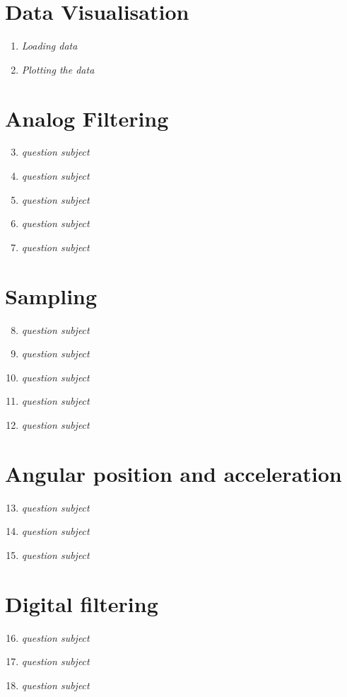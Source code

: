 \documentclass[a4paper,12pt]{article}
\begin{document}
\section{Data Visualisation}
\begin{enumerate}[label={\color{blue}\arabic*)}]

\item \emph{Loading data}


\item \emph{Plotting the data}
\end{enumerate}

\section{Analog Filtering}
\begin{enumerate}[label={\color{blue}\arabic*)}]
  \setcounter{enumi}{2}
  \item \emph{question subject}
  \item \emph{question subject}
  \item \emph{question subject}
  \item \emph{question subject}
  \item \emph{question subject}
\end{enumerate}

\section{Sampling}
\begin{enumerate}[label={\color{blue}\arabic*)}]
  \setcounter{enumi}{7}
  \item \emph{question subject}
  \item \emph{question subject}
  \item \emph{question subject}
  \item \emph{question subject}
  \item \emph{question subject}
\end{enumerate}

\section{Angular position and acceleration}
\begin{enumerate}[label={\color{blue}\arabic*)}]
  \setcounter{enumi}{12}
  \item \emph{question subject}
  \item \emph{question subject}
  \item \emph{question subject}
\end{enumerate}

\section{Digital filtering}
\begin{enumerate}[label={\color{blue}\arabic*)}]
  \setcounter{enumi}{15}
  \item \emph{question subject}
  \item \emph{question subject}
  \item \emph{question subject}
\end{enumerate}
\end{document}
